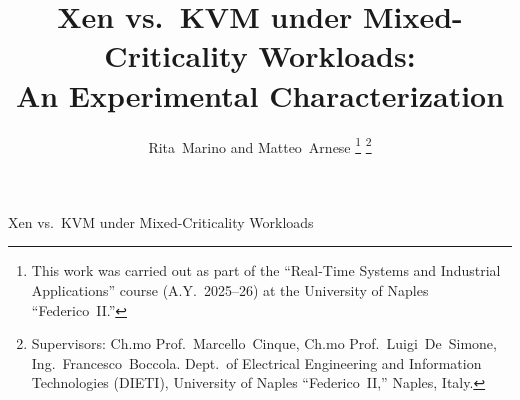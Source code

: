 \documentclass[journal]{IEEEtran}
\begin{document}
%
\title{Xen vs.\ KVM under Mixed-Criticality Workloads:\\An Experimental Characterization}
%
%
%

\author{Rita~Marino and Matteo~Arnese%
\thanks{This work was carried out as part of the ``Real-Time Systems and Industrial Applications'' course (A.Y.\ 2025--26) at the University of Naples ``Federico~II.''}%
\thanks{Supervisors: Ch.mo Prof.\ Marcello~Cinque, Ch.mo Prof.\ Luigi~De~Simone, Ing.\ Francesco~Boccola. Dept.\ of Electrical Engineering and Information Technologies (DIETI), University of Naples ``Federico~II,'' Naples, Italy.}}

% 
%



%
{Xen vs.\ KVM under Mixed-Criticality Workloads}
% 
\end{document}

